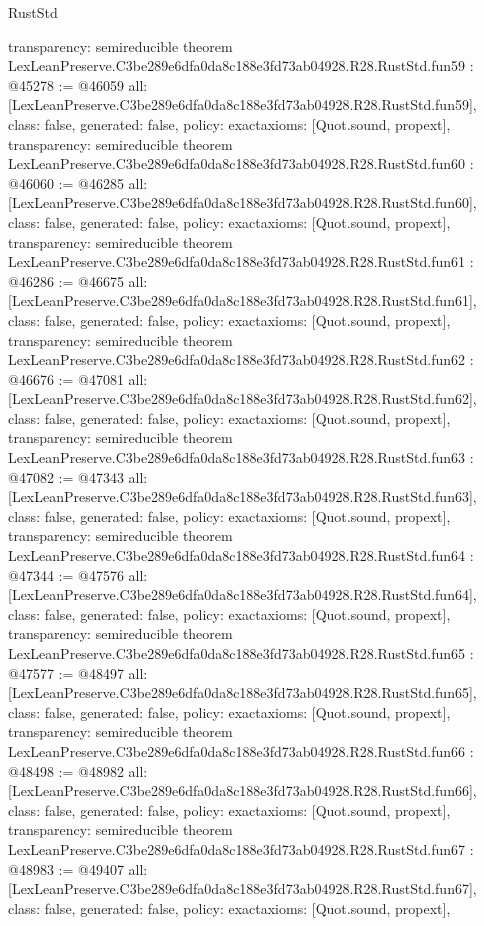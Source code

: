 \begin{lexlean}{RustStd}
\begin{coremodule}
{  transparency: semireducible
}
theorem LexLeanPreserve.C3be289e6dfa0da8c188e3fd73ab04928.R28.RustStd.fun59 : @45278 := @46059 {
  all: [LexLeanPreserve.C3be289e6dfa0da8c188e3fd73ab04928.R28.RustStd.fun59],
  class: false,
  generated: false,
  policy: exact{axioms: [Quot.sound, propext]},
  transparency: semireducible
}
theorem LexLeanPreserve.C3be289e6dfa0da8c188e3fd73ab04928.R28.RustStd.fun60 : @46060 := @46285 {
  all: [LexLeanPreserve.C3be289e6dfa0da8c188e3fd73ab04928.R28.RustStd.fun60],
  class: false,
  generated: false,
  policy: exact{axioms: [Quot.sound, propext]},
  transparency: semireducible
}
theorem LexLeanPreserve.C3be289e6dfa0da8c188e3fd73ab04928.R28.RustStd.fun61 : @46286 := @46675 {
  all: [LexLeanPreserve.C3be289e6dfa0da8c188e3fd73ab04928.R28.RustStd.fun61],
  class: false,
  generated: false,
  policy: exact{axioms: [Quot.sound, propext]},
  transparency: semireducible
}
theorem LexLeanPreserve.C3be289e6dfa0da8c188e3fd73ab04928.R28.RustStd.fun62 : @46676 := @47081 {
  all: [LexLeanPreserve.C3be289e6dfa0da8c188e3fd73ab04928.R28.RustStd.fun62],
  class: false,
  generated: false,
  policy: exact{axioms: [Quot.sound, propext]},
  transparency: semireducible
}
theorem LexLeanPreserve.C3be289e6dfa0da8c188e3fd73ab04928.R28.RustStd.fun63 : @47082 := @47343 {
  all: [LexLeanPreserve.C3be289e6dfa0da8c188e3fd73ab04928.R28.RustStd.fun63],
  class: false,
  generated: false,
  policy: exact{axioms: [Quot.sound, propext]},
  transparency: semireducible
}
theorem LexLeanPreserve.C3be289e6dfa0da8c188e3fd73ab04928.R28.RustStd.fun64 : @47344 := @47576 {
  all: [LexLeanPreserve.C3be289e6dfa0da8c188e3fd73ab04928.R28.RustStd.fun64],
  class: false,
  generated: false,
  policy: exact{axioms: [Quot.sound, propext]},
  transparency: semireducible
}
theorem LexLeanPreserve.C3be289e6dfa0da8c188e3fd73ab04928.R28.RustStd.fun65 : @47577 := @48497 {
  all: [LexLeanPreserve.C3be289e6dfa0da8c188e3fd73ab04928.R28.RustStd.fun65],
  class: false,
  generated: false,
  policy: exact{axioms: [Quot.sound, propext]},
  transparency: semireducible
}
theorem LexLeanPreserve.C3be289e6dfa0da8c188e3fd73ab04928.R28.RustStd.fun66 : @48498 := @48982 {
  all: [LexLeanPreserve.C3be289e6dfa0da8c188e3fd73ab04928.R28.RustStd.fun66],
  class: false,
  generated: false,
  policy: exact{axioms: [Quot.sound, propext]},
  transparency: semireducible
}
theorem LexLeanPreserve.C3be289e6dfa0da8c188e3fd73ab04928.R28.RustStd.fun67 : @48983 := @49407 {
  all: [LexLeanPreserve.C3be289e6dfa0da8c188e3fd73ab04928.R28.RustStd.fun67],
  class: false,
  generated: false,
  policy: exact{axioms: [Quot.sound, propext]},
}
\end{coremodule}
\end{lexlean}
